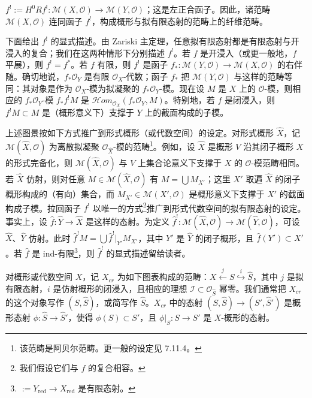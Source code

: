 

$f^{!}:=H^{0}Rf^{!}:\mathcal{M}(X,\mathcal{O})\to\mathcal{M}(Y,\mathcal{O})$；这是左正合函子。因此，诸范畴 $\mathcal{M}(X,\mathcal{O})$ 连同函子 $f^{!}$，构成概形与拟有限态射的范畴上的纤维范畴。

下面给出 $f^{!}$ 的显式描述。由 Zariski 主定理，任意拟有限态射都是有限态射与开浸入的复合；我们在这两种情形下分别描述 $f^{!}$。若 $f$ 是开浸入（或更一般地，$f$ 平展），则 $f^{!}=f^{*}$。若 $f$ 有限，则 $f^{!}$ 是函子 $f_{*}:\mathcal{M}(Y,\mathcal{O})\to\mathcal{M}(X,\mathcal{O})$ 的右伴随。确切地说，$f_{*}\mathcal{O}_{Y}$ 是有限 $\mathcal{O}_{X}$-代数；函子 $f_{*}$ 把 $\mathcal{M}(Y,\mathcal{O})$ 与这样的范畴等同：其对象是作为 $\mathcal{O}_{X}$-模为拟凝聚的 $f_{*}\mathcal{O}_{Y}$-模。现在设 $M$ 是 $X$ 上的 $\mathcal{O}$-模，则相应的 $f_{*}\mathcal{O}_{Y}$-模 $f_{*}f^{!}M$ 是 $\mathcal{H}om_{\mathcal{O}_{X}}(f_{*}\mathcal{O}_{Y},M)$。特别地，若 $f$ 是闭浸入，则 $f^{!}M\subset M$ 是（概形意义下）支撑于 $Y$ 上的截面构成的子模。

上述图景按如下方式推广到形式概形（或代数空间）的设定。对形式概形 $\hat X$，记 $\mathcal{M}(\hat X,\mathcal{O})$ 为离散拟凝聚 $\mathcal{O}_{\hat X}$-模的范畴\footnote{该范畴是阿贝尔范畴。更一般的设定见 7.11.4。}。例如，设 $\hat X$ 是概形 $V$ 沿其闭子概形 $X$ 的形式完备化，则 $\mathcal{M}(\hat X,\mathcal{O})$ 与 $V$ 上集合论意义下支撑于 $X$ 的 $\mathcal{O}$-模范畴相同。若 $\hat X$ 仿射，则对任意 $M\in\mathcal{M}(\hat X,\mathcal{O})$ 有 $M=\bigcup M_{X'}$；这里 $X'$ 取遍 $\hat X$ 的闭子概形构成的（有向）集合，而 $M_{X'}\in\mathcal{M}(X',\mathcal{O})$ 是概形意义下支撑于 $X'$ 的截面构成子模。拉回函子 $f^{!}$ 以唯一的方式\footnote{我们假设它们与 $f$ 的复合相容。}推广到形式代数空间的拟有限态射的设定。事实上，设 $\hat f:\hat Y\to\hat X$ 是这样的态射。为定义 $\hat f^{!}:\mathcal{M}(\hat X,\mathcal{O})\to\mathcal{M}(\hat Y,\mathcal{O})$，可设 $\hat X$、$\hat Y$ 仿射。此时 $\hat f^{!}M=\bigcup\hat f^{!}|_{Y'}M_{X'}$，其中 $Y'$ 是 $\hat Y$ 的闭子概形，且 $\hat f(Y')\subset X'$。若 $\hat f$ 是 ind-有限\footnote{$:=Y_{\mathrm{red}}\to X_{\mathrm{red}}$ 是有限态射。}，则 $\hat f^{!}$ 的显式描述留给读者。


 对概形或代数空间 $X$，记 $X_{cr}$ 为如下图表构成的范畴：$X\overset{j}{\longleftarrow}S\overset{i}{\hookrightarrow}\hat S$，其中 $j$ 是拟有限态射，$i$ 是仿射概形的闭浸入，且相应的理想 $\mathcal{I}\subset\mathcal{O}_{\hat S}$ 幂零。我们通常把 $X_{cr}$ 的这个对象写作 $(S,\hat S)$，或简写作 $\hat S$。$X_{cr}$ 中的态射 $(S,\hat S)\to(S',\hat S')$ 是概形态射 $\phi:\hat S\to\hat S'$，使得 $\phi(S)\subset S'$，且 $\phi|_{S}:S\to S'$ 是 $X$-概形的态射。


